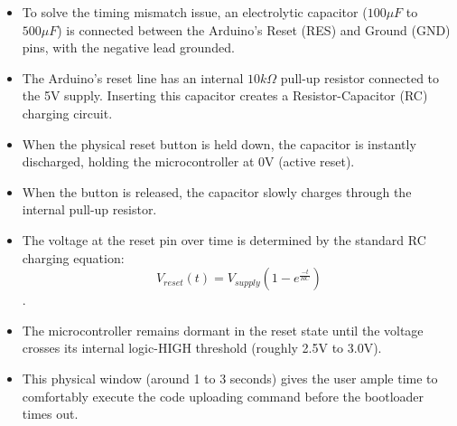 \documentclass[conference]{IEEEtran} %
\begin{document}
\begin{itemize}
    \item To solve the timing mismatch issue, an electrolytic capacitor ($100\mu F$ to $500\mu F$) is connected between the Arduino's Reset (RES) and Ground (GND) pins, with the negative lead grounded.
    \item The Arduino's reset line has an internal $10k\Omega$ pull-up resistor connected to the 5V supply. Inserting this capacitor creates a Resistor-Capacitor (RC) charging circuit. 
    \item When the physical reset button is held down, the capacitor is instantly discharged, holding the microcontroller at 0V (active reset). 
    \item When the button is released, the capacitor slowly charges through the internal pull-up resistor.  
    \item The voltage at the reset pin over time is determined by the standard RC charging equation:$$V_{reset}(t) = V_{supply} \left(1 - e^{\frac{-t}{RC}}\right)$$.
    \item The microcontroller remains dormant in the reset state until the voltage crosses its internal logic-HIGH threshold (roughly 2.5V to 3.0V).
    \item This physical window (around 1 to 3 seconds) gives the user ample time to comfortably execute the code uploading command before the bootloader times out.
\end{itemize}

\end{document}

